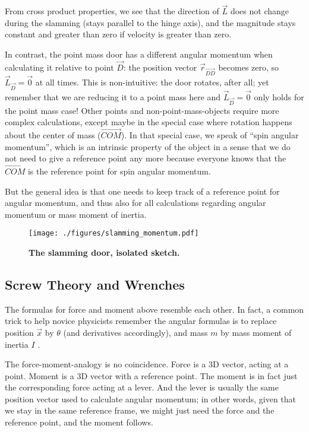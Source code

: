 From cross product properties, we see that the direction of \(\vec{L}\) does not change during the slamming (stays parallel to the hinge axis), and the magnitude stays constant and greater than zero if velocity is greater than zero.

In contrast, the point mass door has a different angular momentum when calculating it relative to point \(\vec{D}\): the position vector \(\vec{r}_{\vec{DD}}\) becomes zero, so \(\vec{L}_{\vec{D}} = \vec{0}\) at all times.
This is non-intuitive: the door rotates, after all; yet remember that we are reducing it to a point mass here and \(\vec{L}_{\vec{D}} = \vec{0}\) only holds for the point mass case!
Other points and non-point-mass-objects require more complex calculations, except maybe in the special case where rotation happens about the center of mass (\(\vec{COM}\)).
In that special case, we speak of ``spin angular momentum'', which is an intrinsic property of the object in a sense that we do not need to give a reference point any more because everyone knows that the \(\vec{COM}\) is the reference point for spin angular momentum.


But the general idea is that one needs to keep track of a reference point for angular momentum, and thus also for all calculations regarding angular momentum or mass moment of inertia.


\begin{figure}[b!]
\centering
\texttt{[image: ./figures/slamming\_momentum.pdf]}
\caption{\label{fig:slamming_momentum}\textbf{The slamming door, isolated sketch.}}
\end{figure}



\FloatBarrier
\subsection{Screw Theory and Wrenches}
\label{sec:org900a900}

The formulas for force and moment above resemble each other.
In fact, a common trick to help novice physicists remember the angular formulas is to replace position \(\vec{x}\) by \(\theta\) (and derivatives accordingly), and mass \(m\) by mass moment of inertia \(I\) \citep{Tipler2007}.

The force-moment-analogy is no coincidence.
Force is a 3D vector, acting at a point.
Moment is a 3D vector with a reference point.
The moment is in fact just the corresponding force acting at a lever.
And the lever is usually the same position vector used to calculate angular momentum; in other words, given that we stay in the same reference frame, we might just need the force and the reference point, and the moment follows.

